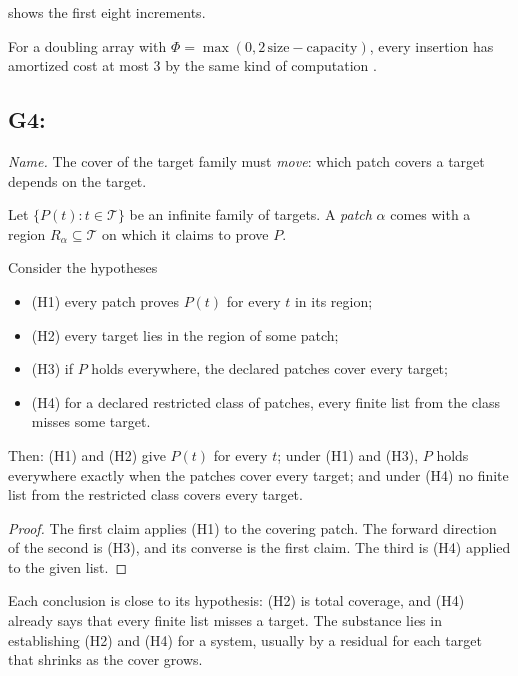  shows the first eight increments.



For a doubling array with $\Phi = \max(0, 2\,\mathrm{size} - \mathrm{capacity})$, every insertion
has amortized cost at most $3$ by the same kind of computation \citep{CormenEtAl}.

\subsection{G4: \lawGFour}\label{sec:G4}

\emph{Name.} The cover of the target family must \emph{move}: which patch covers a target depends
on the target.

Let $\{P(t) : t \in \mathcal T\}$ be an infinite family of targets. A \emph{patch} $\alpha$ comes
with a region $R_\alpha \subseteq \mathcal T$ on which it claims to prove $P$.

\begin{theorem}\label{thm:G4}
Consider the hypotheses
\begin{itemize}
  \item \textup{(H1)} every patch proves $P(t)$ for every $t$ in its region;
  \item \textup{(H2)} every target lies in the region of some patch;
  \item \textup{(H3)} if $P$ holds everywhere, the declared patches cover every target;
  \item \textup{(H4)} for a declared restricted class of patches, every finite list from the class
    misses some target.
\end{itemize}
Then: (H1) and (H2) give $P(t)$ for every $t$; under (H1) and (H3), $P$ holds everywhere exactly
when the patches cover every target; and under (H4) no finite list from the restricted class covers
every target.
\end{theorem}

\begin{proof}
The first claim applies (H1) to the covering patch. The forward direction of the second is (H3),
and its converse is the first claim. The third is (H4) applied to the given list.
\end{proof}

Each conclusion is close to its hypothesis: (H2) is total coverage, and (H4) already says that every
finite list misses a target. The substance lies in establishing (H2) and (H4) for a system, usually
by a residual for each target that shrinks as the cover grows.

